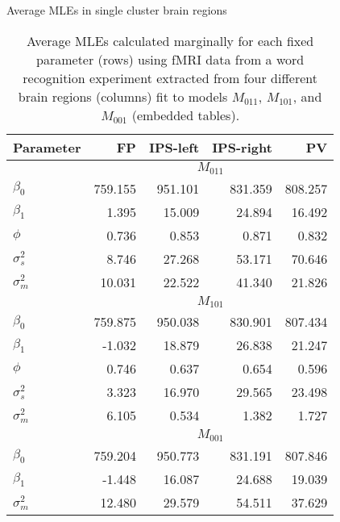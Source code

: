 %

\begin{table}
\ssp
\centering
\caption{Average MLEs in single cluster brain regions} \label{tab:fmri:mle:means}
\begin{tabular}{|l|rrrr|}
\hline
Parameter & FP & IPS-left & IPS-right & PV \\
\hline
 & \multicolumn{4}{|c|}{$M_{011}$} \\
\hline
$\beta_0$ & 759.155 & 951.101 & 831.359 & 808.257 \\
$\beta_1$ & 1.395 & 15.009 & 24.894 & 16.492 \\
$\phi$ & 0.736 & 0.853 & 0.871 & 0.832 \\
$\sigma^2_s$ & 8.746 & 27.268 & 53.171 & 70.646 \\
$\sigma^2_m$ & 10.031 & 22.522 & 41.340 & 21.826 \\
\hline
 & \multicolumn{4}{|c|}{$M_{101}$} \\
\hline
$\beta_0$ & 759.875 & 950.038 & 830.901 & 807.434 \\
$\beta_1$ & -1.032 & 18.879 & 26.838 & 21.247 \\
$\phi$ & 0.746 & 0.637 & 0.654 & 0.596 \\
$\sigma^2_s$ & 3.323 & 16.970 & 29.565 & 23.498 \\
$\sigma^2_m$ & 6.105 & 0.534 & 1.382 & 1.727 \\
\hline
 & \multicolumn{4}{|c|}{$M_{001}$} \\
\hline
$\beta_0$ & 759.204 & 950.773 & 831.191 & 807.846 \\
$\beta_1$ & -1.448 & 16.087 & 24.688 & 19.039 \\
$\sigma^2_m$ & 12.480 & 29.579 & 54.511 & 37.629 \\
\hline
\end{tabular}
\caption*{Average MLEs calculated marginally for each fixed parameter (rows) using fMRI data from a word recognition experiment extracted from four different brain regions (columns) fit to models $M_{011}$, $M_{101}$, and $M_{001}$ (embedded tables).}
\end{table}


